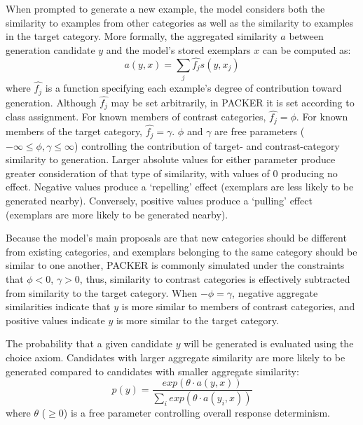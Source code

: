 \documentclass[10pt,letterpaper]{article}
\begin{document}

When prompted to generate a new example, the model considers both the similarity to examples from other categories as well as the similarity to examples in the target category. More formally, the aggregated similarity $a$ between generation candidate $y$ and the model's stored exemplars $x$ can be computed as:
\begin{equation}
  a(y, x) = \sum_j{\hat{f_j} s(y, x_j)}
  \label{eq:packer-ss}
\end{equation}
where $\hat{f_j}$ is a function specifying each example's degree of contribution toward generation. Although $\hat{f_j}$ may be set arbitrarily, in PACKER it is set according to class assignment. For known members of contrast categories, $\hat{f_j} = \phi$. For known members of the target category, $\hat{f_j} = \gamma$. $\phi$ and $\gamma$ are free parameters ($-\infty \leq \phi, \gamma \leq \infty$) controlling the contribution of target- and contrast-category similarity to generation. Larger absolute values for either parameter produce greater consideration of that type of similarity, with values of 0 producing no effect. Negative values produce a `repelling' effect (exemplars are less likely to be generated nearby). Conversely, positive values produce a `pulling' effect (exemplars are more likely to be generated nearby). 

Because the model's main proposals are that new categories should be different from existing categories, and exemplars belonging to the same category should be similar to one another, PACKER is commonly simulated under the constraints that $\phi < 0$, $\gamma > 0$, thus, similarity to contrast categories is effectively subtracted from similarity to the target category. When $-\phi = \gamma$, negative aggregate similarities indicate that $y$ is more similar to members of contrast categories, and positive values indicate $y$ is more similar to the target category.

The probability that a given candidate $y$ will be generated is evaluated using the \citet{luce1977choice} choice axiom. Candidates with larger aggregate similarity are more likely to be generated compared to candidates with smaller aggregate similarity:
\begin{equation}
p(y) = \dfrac
    { exp( { \theta \cdot a(y, x) } ) }
    { \sum_i{ exp( { \theta \cdot a(y_i, x) } ) } }
    \label{eq:packer-choice}
\end{equation}
where $\theta$ ($\geq 0$) is a free parameter controlling overall response determinism. 
\end{document}
